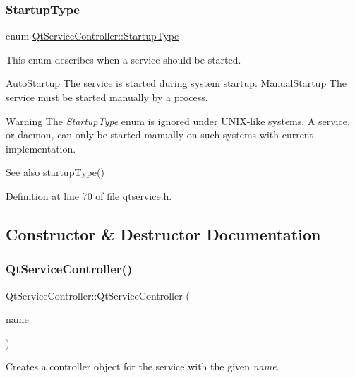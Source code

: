 \subsubsection{\texorpdfstring{Startup\+Type}{StartupType}}
{\footnotesize\ttfamily enum \mbox{\hyperlink{class_qt_service_controller_a946ac2b079d9760503da923c2eaf0aac}{Qt\+Service\+Controller\+::\+Startup\+Type}}}

This enum describes when a service should be started.

Auto\+Startup The service is started during system startup.  Manual\+Startup The service must be started manually by a process.

\begin{DoxyWarning}{Warning}
The {\itshape Startup\+Type} enum is ignored under U\+N\+I\+X-\/like systems. A service, or daemon, can only be started manually on such systems with current implementation.
\end{DoxyWarning}
\begin{DoxySeeAlso}{See also}
\mbox{\hyperlink{class_qt_service_controller_acfd3b5cb23c17bf415f1d606b8461109}{startup\+Type()}} 
\end{DoxySeeAlso}


Definition at line 70 of file qtservice.\+h.



\subsection{Constructor \& Destructor Documentation}
\mbox{\label{class_qt_service_controller_ab5c5bb7d168d2e59f0784ded380d7adf}} 
\subsubsection{\texorpdfstring{Qt\+Service\+Controller()}{QtServiceController()}}
{\footnotesize\ttfamily Qt\+Service\+Controller\+::\+Qt\+Service\+Controller (\begin{DoxyParamCaption}\item[{const Q\+String \&}]{name }\end{DoxyParamCaption})}

Creates a controller object for the service with the given {\itshape name}. 

